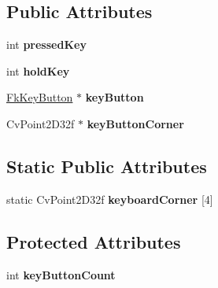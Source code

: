 \subsection*{Public Attributes}
\begin{DoxyCompactItemize}
\item 
\hypertarget{class_fk_paper_keyboard_a0aebf1ba5650fbb96fefa41fb4c845d6}{}int {\bfseries pressed\+Key}\label{class_fk_paper_keyboard_a0aebf1ba5650fbb96fefa41fb4c845d6}

\item 
\hypertarget{class_fk_paper_keyboard_a170bb085d0209dc60dddfa464aba64bb}{}int {\bfseries hold\+Key}\label{class_fk_paper_keyboard_a170bb085d0209dc60dddfa464aba64bb}

\item 
\hypertarget{class_fk_paper_keyboard_ae67039ff8ca694bf9ad4bddb007b78c0}{}\hyperlink{class_fk_key_button}{Fk\+Key\+Button} $\ast$ {\bfseries key\+Button}\label{class_fk_paper_keyboard_ae67039ff8ca694bf9ad4bddb007b78c0}

\item 
\hypertarget{class_fk_paper_keyboard_ace773add8adcc3e605f03f03bbab6a5c}{}Cv\+Point2\+D32f $\ast$ {\bfseries key\+Button\+Corner}\label{class_fk_paper_keyboard_ace773add8adcc3e605f03f03bbab6a5c}

\end{DoxyCompactItemize}
\subsection*{Static Public Attributes}
\begin{DoxyCompactItemize}
\item 
\hypertarget{class_fk_paper_keyboard_afb65262c8538e18b234632e244e1e39f}{}static Cv\+Point2\+D32f {\bfseries keyboard\+Corner} \mbox{[}4\mbox{]}\label{class_fk_paper_keyboard_afb65262c8538e18b234632e244e1e39f}

\end{DoxyCompactItemize}
\subsection*{Protected Attributes}
\begin{DoxyCompactItemize}
\item 
\hypertarget{class_fk_paper_keyboard_a6214790e033a5dea2e1ac8ccfc775a6a}{}int {\bfseries key\+Button\+Count}\label{class_fk_paper_keyboard_a6214790e033a5dea2e1ac8ccfc775a6a}

\end{DoxyCompactItemize}


